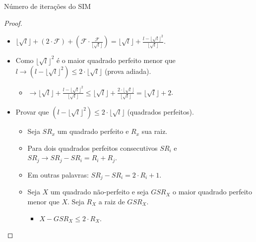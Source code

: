 \documentclass[10pt]{beamer}
\begin{document}
\begin{frame}{Número de iterações do SIM \hyperlink{number_iterations}{}}
\hypertarget{number_iterations_slide}{}
  \begin{proof}
      \begin{itemize}
	\item <1-> $\lfloor\sqrt{l}\rfloor + (2 \cdot \mathcal{F}) + (\mathcal{F} \cdot \frac{\mathcal{F}}{\lfloor\sqrt{l}\rfloor}) = \lfloor\sqrt{l}\rfloor + \frac{l - {\lfloor\sqrt{l}\rfloor}^{2}}{\lfloor\sqrt{l}\rfloor}$.
	\item <2-> Como ${\lfloor\sqrt{l}\rfloor}^{2}$ é o maior quadrado perfeito menor que $l \rightarrow (l - {\lfloor\sqrt{l}\rfloor}^{2}) \le 2 \cdot \lfloor\sqrt{l}\rfloor$ (prova adiada).
	\begin{itemize}
	  \item <3-> $\rightarrow \lfloor\sqrt{l}\rfloor + \frac{l - {\lfloor\sqrt{l}\rfloor}^{2}}{\lfloor\sqrt{l}\rfloor} \le \lfloor\sqrt{l}\rfloor + \frac{2 \cdot \lfloor\sqrt{l}\rfloor}{\lfloor\sqrt{l}\rfloor} = \lfloor\sqrt{l}\rfloor + 2$.
	\end{itemize}
	\item <4-> Provar que $(l - {\lfloor\sqrt{l}\rfloor}^{2}) \le 2 \cdot \lfloor\sqrt{l}\rfloor$ (quadrados perfeitos).
	\begin{itemize}
	  \item <5-> Seja $SR_{x}$ um quadrado perfeito e $R_x$ sua raiz.
	  \item <6-> Para dois quadrados perfeitos consecutivos $SR_{i}$ e $SR_{j} \rightarrow SR_{j} - SR_{i} = R_i + R_j$.
	  \item <7-> Em outras palavras: $SR_{j} - SR_{i} = 2 \cdot R_i + 1$.
	  \item <8-> Seja $X$ um quadrado não-perfeito e seja $GSR_X$ o maior quadrado perfeito menor que $X$. Seja $R_X$ a raiz de $GSR_X$.
	  \begin{itemize}
	    \item <9-> $X - GSR_{X} \le 2 \cdot R_{X}$.
	  \end{itemize}

	\end{itemize}

      \end{itemize}
  \end{proof}
\end{frame}
\end{document}
